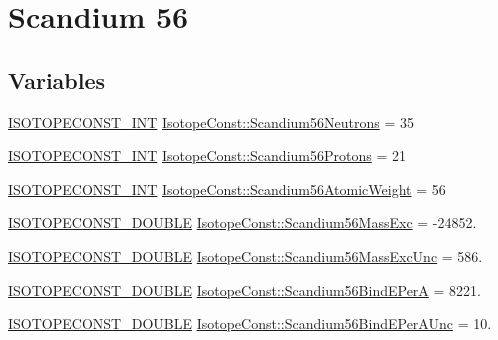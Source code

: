 \hypertarget{group___isotope_const-_scandium-_sc56}{}\section{Scandium 56}
\label{group___isotope_const-_scandium-_sc56}
\subsection*{Variables}
\begin{DoxyCompactItemize}
\item 
\mbox{\hyperlink{group___isotope_const-_macros_ga5f18360b3e99483a35c32d789e62621c}{I\+S\+O\+T\+O\+P\+E\+C\+O\+N\+S\+T\+\_\+\+I\+NT}} \mbox{\hyperlink{group___isotope_const-_scandium-_sc56_ga81951ea0183fdbb4b159059eda60f0a5}{Isotope\+Const\+::\+Scandium56\+Neutrons}} = 35
\item 
\mbox{\hyperlink{group___isotope_const-_macros_ga5f18360b3e99483a35c32d789e62621c}{I\+S\+O\+T\+O\+P\+E\+C\+O\+N\+S\+T\+\_\+\+I\+NT}} \mbox{\hyperlink{group___isotope_const-_scandium-_sc56_gaef4d6475f8fcc70c4b66e444f02f098f}{Isotope\+Const\+::\+Scandium56\+Protons}} = 21
\item 
\mbox{\hyperlink{group___isotope_const-_macros_ga5f18360b3e99483a35c32d789e62621c}{I\+S\+O\+T\+O\+P\+E\+C\+O\+N\+S\+T\+\_\+\+I\+NT}} \mbox{\hyperlink{group___isotope_const-_scandium-_sc56_ga3301cec46972145d1a5efd2e6542e146}{Isotope\+Const\+::\+Scandium56\+Atomic\+Weight}} = 56
\item 
\mbox{\hyperlink{group___isotope_const-_macros_ga8f45a7272ce02c0b4c65c44636ed719a}{I\+S\+O\+T\+O\+P\+E\+C\+O\+N\+S\+T\+\_\+\+D\+O\+U\+B\+LE}} \mbox{\hyperlink{group___isotope_const-_scandium-_sc56_gae502c5d7c4469d9b89ec7a94c2eb7e3d}{Isotope\+Const\+::\+Scandium56\+Mass\+Exc}} = -\/24852.
\item 
\mbox{\hyperlink{group___isotope_const-_macros_ga8f45a7272ce02c0b4c65c44636ed719a}{I\+S\+O\+T\+O\+P\+E\+C\+O\+N\+S\+T\+\_\+\+D\+O\+U\+B\+LE}} \mbox{\hyperlink{group___isotope_const-_scandium-_sc56_ga3a8a77c797585ffdff78a632eea79a17}{Isotope\+Const\+::\+Scandium56\+Mass\+Exc\+Unc}} = 586.
\item 
\mbox{\hyperlink{group___isotope_const-_macros_ga8f45a7272ce02c0b4c65c44636ed719a}{I\+S\+O\+T\+O\+P\+E\+C\+O\+N\+S\+T\+\_\+\+D\+O\+U\+B\+LE}} \mbox{\hyperlink{group___isotope_const-_scandium-_sc56_ga3a41e9a8858f3a47333b262d5a8dbe37}{Isotope\+Const\+::\+Scandium56\+Bind\+E\+PerA}} = 8221.
\item 
\mbox{\hyperlink{group___isotope_const-_macros_ga8f45a7272ce02c0b4c65c44636ed719a}{I\+S\+O\+T\+O\+P\+E\+C\+O\+N\+S\+T\+\_\+\+D\+O\+U\+B\+LE}} \mbox{\hyperlink{group___isotope_const-_scandium-_sc56_ga42cbc0bcce1ab951dc763fc472fbfc20}{Isotope\+Const\+::\+Scandium56\+Bind\+E\+Per\+A\+Unc}} = 10.

\end{DoxyCompactItemize}
